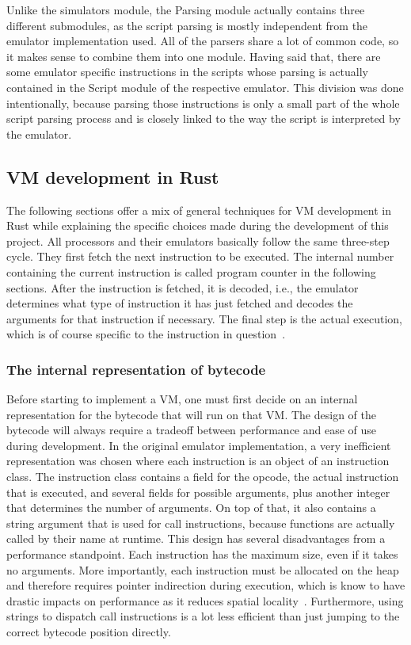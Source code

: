 Unlike the simulators module, the Parsing module actually contains three different submodules, as the script parsing is mostly independent from the emulator implementation used.
All of the parsers share a lot of common code, so it makes sense to combine them into one module.
Having said that, there are some emulator specific instructions in the scripts whose parsing is actually contained in the Script module of the respective emulator.
This division was done intentionally, because parsing those instructions is only a small part of the whole script parsing process and is closely linked to the way the script is interpreted by the emulator.

\subsection{VM development in Rust} \label{rust-vm-dev}
The following sections offer a mix of general techniques for VM development in Rust while explaining the specific choices made during the development of this project.
All processors and their emulators basically follow the same three-step cycle. They first fetch the next instruction to be executed. The internal number containing the current instruction is called program counter in the following sections.
After the instruction is fetched, it is decoded, i.e., the emulator determines what type of instruction it has just fetched and decodes the arguments for that instruction if necessary.
The final step is the actual execution, which is of course specific to the instruction in question~\cite{nystrom2021crafting}.

\subsubsection{The internal representation of bytecode}
Before starting to implement a VM, one must first decide on an internal representation for the bytecode that will run on that VM.
The design of the bytecode will always require a tradeoff between performance and ease of use during development.
In the original emulator implementation, a very inefficient representation was chosen where each instruction is an object of an instruction class.
The instruction class contains a field for the opcode, the actual instruction that is executed, and several fields for possible arguments, plus another integer that determines the number of arguments.
On top of that, it also contains a string argument that is used for call instructions, because functions are actually called by their name at runtime.
This design has several disadvantages from a performance standpoint.
Each instruction has the maximum size, even if it takes no arguments.
More importantly, each instruction must be allocated on the heap and therefore requires pointer indirection during execution, which is know to have drastic impacts on performance as it reduces spatial locality~\cite{6498541}.
Furthermore, using strings to dispatch call instructions is a lot less efficient than just jumping to the correct bytecode position directly.

